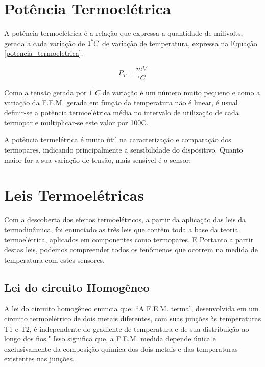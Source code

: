 \documentclass[a4paper,12pt]{report}
\begin{document}
		\section{Potência Termoelétrica}
	
	A potência termoelétrica é a relação que expressa a quantidade de milivolts, gerada a cada variação de $1^\degree C$ de variação de temperatura, expressa na Equação \ref{potencia_termoeletrica}.
	
	\begin{equation}
	P_{T} = \frac{mV}{^{\circ}C}
	\label{potencia_termoeletrica}
	\end{equation}
	
	\singlespacing
	
	Como a tensão gerada por $1^{\circ}C$ de variação é um número muito pequeno e como a variação da F.E.M. gerada em função da temperatura não é linear, é usual definir-se a potência termoelétrica média no intervalo de utilização de cada termopar e multiplicar-se este valor por 100\degree C.
	
	\singlespacing
	
	A potência termelétrica é muito útil na caracterização e comparação dos termopares, indicando principalmente a sensibilidade do dispositivo. Quanto maior for a sua variação de tensão, mais sensível é o sensor.
	
	\newpage
	\section{Leis Termoelétricas}
	
	Com a descoberta dos efeitos termoelétricos, a partir da aplicação das leis da termodinâmica, foi enunciado as três leis que contêm toda a base da teoria termoelétrica, aplicados em componentes como termopares. E Portanto a partir destas leis, podemos compreender todos os fenômenos que ocorrem na medida de temperatura com estes sensores. 
	
	\subsection{Lei do circuito Homogêneo}
	
	A lei do circuito homogêneo enuncia que: “A F.E.M. termal, desenvolvida em um circuito termoelétrico de dois metais diferentes, com suas junções às temperaturas T1 e T2, é independente do gradiente de temperatura e de sua distribuição ao longo dos fios." Isso significa que, a F.E.M. medida depende única e exclusivamente da composição química dos dois metais e das temperaturas existentes nas junções.
	
\end{document}
